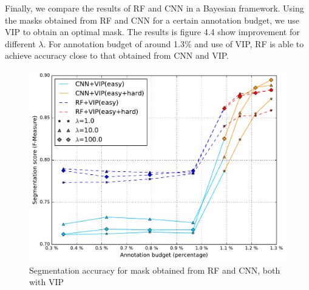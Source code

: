 Finally, we compare the results of RF and CNN in a Bayesian framework. Using the masks obtained from RF and CNN for a certain annotation budget, we use VIP to obtain an optimal mask. The results is figure 4.4 show improvement for different $\lambda$. For annotation budget of around 1.3\% and use of VIP, RF is able to achieve accuracy close to that obtained from CNN and VIP. 


\begin{figure}[h!] \label{fig:cnnvip}
\centering
 \includegraphics[width=0.8\linewidth]{figures/cnn_vs_rf_vip.pdf} 
\caption{Segmentation accuracy for mask obtained from RF and CNN, both with VIP}
\end{figure}
